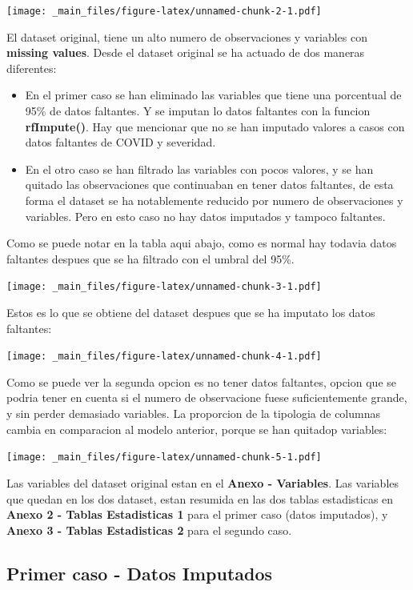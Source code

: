 \documentclass[
]{article}
\begin{document}
\texttt{[image: \_main\_files/figure-latex/unnamed-chunk-2-1.pdf]}

El dataset original, tiene un alto numero de observaciones y variables
con \textbf{missing values}. Desde el dataset original se ha actuado de
dos maneras diferentes:

\begin{itemize}
\item
  En el primer caso se han eliminado las variables que tiene una
  porcentual de 95\% de datos faltantes. Y se imputan lo datos faltantes
  con la funcion \textbf{rfImpute()}. Hay que mencionar que no se han
  imputado valores a casos con datos faltantes de COVID y severidad.
\item
  En el otro caso se han filtrado las variables con pocos valores, y se
  han quitado las observaciones que continuaban en tener datos
  faltantes, de esta forma el dataset se ha notablemente reducido por
  numero de observaciones y variables. Pero en esto caso no hay datos
  imputados y tampoco faltantes.
\end{itemize}

Como se puede notar en la tabla aqui abajo, como es normal hay todavia
datos faltantes despues que se ha filtrado con el umbral del 95\%.

\texttt{[image: \_main\_files/figure-latex/unnamed-chunk-3-1.pdf]}

Estos es lo que se obtiene del dataset despues que se ha imputato los
datos faltantes:

\texttt{[image: \_main\_files/figure-latex/unnamed-chunk-4-1.pdf]}

Como se puede ver la segunda opcion es no tener datos faltantes, opcion
que se podria tener en cuenta si el numero de observacione fuese
suficientemente grande, y sin perder demasiado variables. La proporcion
de la tipologia de columnas cambia en comparacion al modelo anterior,
porque se han quitadop variables:

\texttt{[image: \_main\_files/figure-latex/unnamed-chunk-5-1.pdf]}

Las variables del dataset original estan en el \textbf{Anexo -
Variables}. Las variables que quedan en los dos dataset, estan resumida
en las dos tablas estadisticas en \textbf{Anexo 2 - Tablas Estadisticas
1} para el primer caso (datos imputados), y \textbf{Anexo 3 - Tablas
Estadisticas 2} para el segundo caso.

\hypertarget{primer-caso---datos-imputados}{%
\subsection{Primer caso - Datos
Imputados}\label{primer-caso---datos-imputados}}
\end{document}
